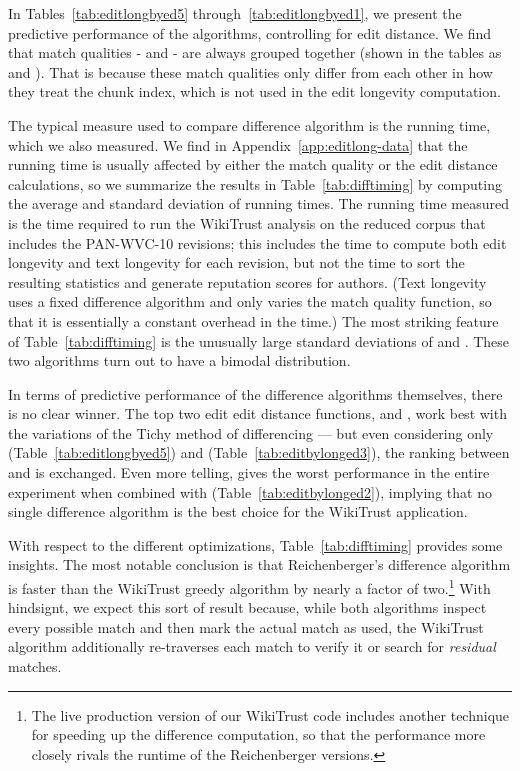 In Tables~\ref{tab:editlongbyed5} through~\ref{tab:editlongbyed1},
we present the predictive performance of the algorithms,
controlling for edit distance.
We find that match qualities - and - are always grouped
together (shown in the tables as  and ).
That is because these match qualities only differ from each
other in how they treat the chunk index, which is not used in the
edit longevity computation.



The typical measure used to compare difference algorithm is the
running time, which we also measured.
We find in Appendix~\ref{app:editlong-data} that the running time
is usually affected by either the
match quality or the edit distance calculations, so we
summarize the results in Table~\ref{tab:difftiming} by
computing the average and standard deviation of running times.
The running time measured is the time required to run the
WikiTrust analysis on the reduced corpus that includes
the PAN-WVC-10 revisions; this includes the time to compute
both edit longevity and text longevity for each revision,
but not the time to sort the resulting statistics and generate
reputation scores for authors.
(Text longevity uses a fixed difference algorithm and only varies
the match quality function, so that it is essentially a constant
overhead in the time.)
The most striking feature of Table~\ref{tab:difftiming} is the unusually
large standard deviations of  and .
These two algorithms turn out to have a bimodal distribution.

In terms of predictive performance of the difference algorithms
themselves, there is no clear winner.
The top two edit edit distance functions,  and ,
work best with the variations of the Tichy method of differencing ---
but even considering only  (Table~\ref{tab:editlongbyed5})
and  (Table~\ref{tab:editbylonged3}), the ranking between 
and  is exchanged.
Even more telling,  gives the worst performance in the entire
experiment when combined with  (Table~\ref{tab:editbylonged2}),
implying that no single difference algorithm is the best choice for
the WikiTrust application.

With respect to the different optimizations, Table~\ref{tab:difftiming}
provides some insights.
The most notable conclusion is that Reichenberger's
difference algorithm is faster than the WikiTrust
greedy algorithm by nearly a factor of two.\footnote{The live
production version of our WikiTrust code includes another technique
for speeding up the difference computation, so that the performance
more closely rivals the runtime of the Reichenberger versions.}
With hindsignt, we expect this sort of result because, while both algorithms
inspect every possible match and then mark the actual
match as used, the WikiTrust algorithm additionally
re-traverses each match to verify it or search for
\textit{residual} matches.

